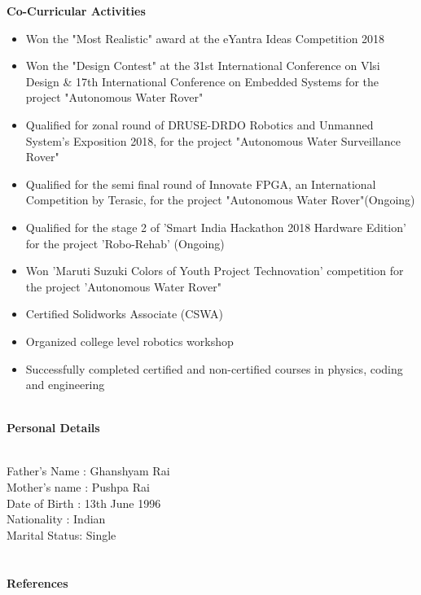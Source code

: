 \documentclass[letterpaper,11pt]{article}
\newcommand{\SmallSep}{\vspace{0.5em}}
\newcommand{\CVSection}[1]
{\Large\textbf{#1}\par
	\SmallSep\normalsize\normalfont}
\begin{document}
\CVSection{Co-Curricular Activities}

\begin{itemize}
	\item Won the "Most Realistic" award at the eYantra Ideas Competition 2018 
	\item Won the "Design Contest" at the 31st International Conference on Vlsi Design \& 17th International Conference on Embedded Systems for the project "Autonomous Water Rover"
	\item Qualified for zonal round of DRUSE-DRDO Robotics and Unmanned System's Exposition 2018, for the project "Autonomous Water Surveillance Rover"
	\item Qualified for the semi final round of Innovate FPGA, an International Competition by Terasic, for the project "Autonomous Water Rover"(Ongoing)
	\item Qualified for the stage 2 of 'Smart India Hackathon 2018 Hardware Edition' for the project 'Robo-Rehab' (Ongoing)
	\item Won 'Maruti Suzuki Colors of Youth Project Technovation' competition for the project 'Autonomous Water Rover"
	\item Certified Solidworks Associate (CSWA)
	\item Organized college level robotics workshop
	\item Successfully completed certified and non-certified courses in physics, coding and engineering 
	
\end{itemize} 

\textbf{}  \\

\CVSection{Personal Details}
\textbf{}  \\
Father's Name : Ghanshyam Rai\\
Mother's name : Pushpa Rai\\
Date of Birth\hspace{0.28cm} : 13th June 1996\\
Nationality   \hspace{0.68cm}: Indian \\
Marital Status\hspace{0.25cm}: Single\\
\textbf{}  \\
\textbf{}  \\

\CVSection{References}
\end{document}
